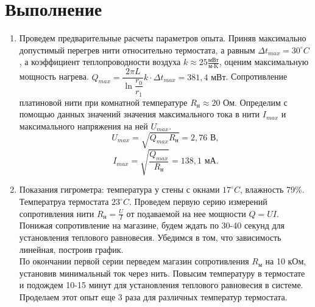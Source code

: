\documentclass[a4paper]{article}
\begin{document}
\section{Выполнение}
\begin{enumerate}
\item Проведем предварительные расчеты параметров опыта. Приняв максимально допустимый перегрев нити относительно термостата, а равным $\Delta t_{max} = 30 ^\circ C$ , а коэффициент теплопроводности воздуха $k \approx 25 \frac{\text{мВт}}{\text{м} \cdot \text{K}}$, оценим максимальную мощность нагрева. $Q_{max} = \dfrac{2 \pi L}{\ln \dfrac{r_0}{r_1}} k  \cdot \Delta t_{max} = 381,4 \text{ мВт}$. Сопротивление платиновой нити при комнатной температуре $R_\text{н} \approx 20 \text{ Ом}$. Определим с помощью данных значений значения максимального тока в нити $I_{max}$ и максимального напряжения на ней $U_{max}$.
\begin{equation*}
	U_{max} = \sqrt{Q_{max} R_\text{н}} = 2,76 \text{ В},
\end{equation*}
\begin{equation*}
	I_{max} = \sqrt{\frac{Q_{max}} {R_\text{н}}} = 138,1 \text{ мА}.
\end{equation*}
\item Показания гигрометра: температура у стены с окнами $17 ^\circ C$, влажность 79\%. Температруа термостата $23 ^\circ C$. Проведем первую серию измерений сопротивления нити $R_\text{н} = \frac{U}{I}$ от подаваемой на нее мощности $Q = UI$. Понижая сопротивление на магазине, будем ждать по 30-40 секунд для установления теплового равновесия. Убедимся в том, что зависимость линейная, построив график.\\
По окончании первой серии перведем магазин сопротивления $R_\text{м}$ на 10 кОм, установив минимальный ток через нить. Повысим температуру в термостате и подождем 10-15 минут для установления теплового равновесия в системе. Проделаем этот опыт еще 3 раза для различных температур термостата.
\end{enumerate}
\end{document}
